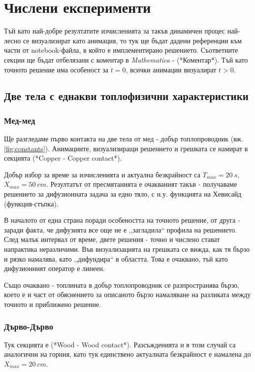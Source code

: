 \section{Числени експерименти}
Тъй като най-добре резултатите изчисленията за такъв динамичен процес най-лесно се визуализират като анимация, то тук ще бъдат дадени референции към части от notebook-файла, в който е имплементирано решението.
Съответните секции ще бъдат отбелязани с коментар в \textit{Mathematica} - \textcolor{comment}{(*Коментар*)}.
Тъй като точното решение има особеност за $t = 0$, всички анимации визуалират $t>0$.
\subsection{Две тела с еднакви топлофизични характеристики}
\subsubsection{Мед-мед}
Ще разгледаме първо контакта на две тела от мед - добър топлопроводник (вж. \autoref{fig:constants}). Анимациите, визуализиращи решението и грешката се намират в секцията  \textcolor{comment}{(*Copper - Copper contact*)}.

Добър избор за време за изчисленията и актуална безкрайност са $T_{max} = 20~s$, $X_{max} = 50~cm$. Резултатът от пресмятанията е очакваният такъв - получаваме решението за дифузионната задача за едно тяло, с н.у. функцията на
Хевисайд (функция-стъпка).

В началото от една страна поради особеността на точното решение, от друга - заради факта, че дифузията все още не е ,,загладила`` профила на решението. След малък интервал от време, двете решения - точно и числено стават напрактика неразличими. Във визуализацията на грешката
се вижда, как тя бързо и рязко намалява, като ,,дифундира`` в областта. Това е очаквано, тъй като дифузионният оператор е линеен.

Също очаквано - топлината в добър топлопроводник се разпространява бързо, което е и част от обяснението за описаното бързо намаляване на разликата между точното и приближено решение.

\subsubsection{Дърво-Дърво}
\label{sect:WoodWood}
Тук секцията е \textcolor{comment}{(*Wood - Wood contact*)}.
 Разсъжденията и в този случай са аналогични на горния, като тук единствено актуалната безкрайност е намалена до $X_{max}=20~cm$. 
 

